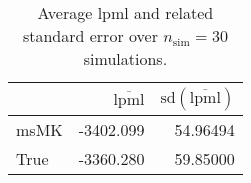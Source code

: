 \begin{table}[H]

\caption{Average lpml and related standard error over $n_{\text{sim}} = 30$ simulations.}
\centering
\begin{tabular}[t]{lrr}
\toprule
  & $\overbar{\text{lpml}}$ & $\text{sd}(\overbar{\text{lpml}})$\\
\midrule
msMK & -3402.099 & 54.96494\\
True & -3360.280 & 59.85000\\
\bottomrule
\end{tabular}
\end{table}